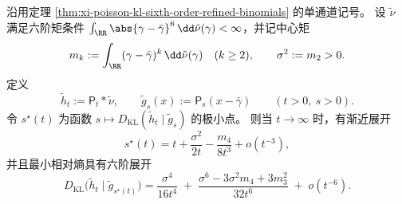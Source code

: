 \begin{theorem}\label{thm:xi-poisson-optimal-cauchy-rescaling-sixth-order}
沿用定理 \ref{thm:xi-poisson-kl-sixth-order-refined-binomials} 的单通道记号。
设 \(\tilde\nu\) 满足六阶矩条件
\(
\int_{\RR}\abs{\gamma-\bar\gamma}^{6}\,\dd\tilde\nu(\gamma)<\infty
\)，并记中心矩
\[
m_k:=\int_{\RR}(\gamma-\bar\gamma)^k\,\dd\tilde\nu(\gamma)\quad(k\ge 2),
\qquad
\sigma^2:=m_2>0.
\]
定义
\[
\tilde h_t:=\mathsf P_t*\tilde\nu,\qquad
\tilde g_s(x):=\mathsf P_s(x-\bar\gamma)\qquad(t>0,\ s>0).
\]
令 \(s^\star(t)\) 为函数 \(s\mapsto D_{\mathrm{KL}}(\tilde h_t\mid \tilde g_s)\) 的极小点。
则当 \(t\to\infty\) 时，有渐近展开
\begin{equation}\label{eq:xi-poisson-optimal-scale-expansion-sixth}
s^\star(t)=t+\frac{\sigma^2}{2t}-\frac{m_4}{8t^3}+o(t^{-3}),
\end{equation}
并且最小相对熵具有六阶展开
\begin{equation}\label{eq:xi-poisson-optimal-scale-min-kl-sixth}
D_{\mathrm{KL}}\bigl(\tilde h_t\mid \tilde g_{s^\star(t)}\bigr)
=\frac{\sigma^4}{16t^4}
\;+\;\frac{\sigma^6-3\sigma^2m_4+3m_3^2}{32t^6}
\;+\;o(t^{-6}).
\end{equation}
\end{theorem}
